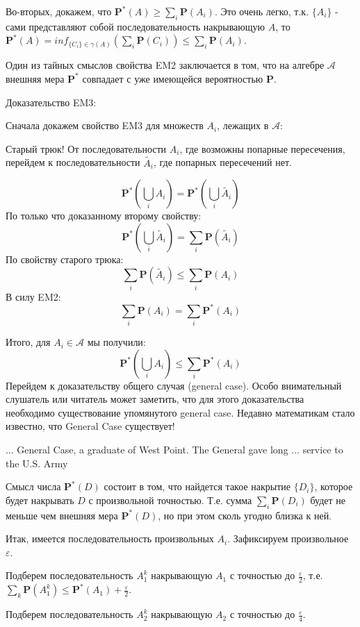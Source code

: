 {Во-вторых, докажем, что
$\mathbf{P^{*}}(A)\geq\sum_{i}\mathbf{P}(A_{i})$. Это очень легко,
т.к. $\{A_{i}\}$ - сами представляют собой последовательность
накрывающую $A$, то $\mathbf{P^{*}}(A)=inf_{\{C_{i}\}\in
\gamma(A)}(\sum_{i}\mathbf{P}(C_{i}))\leq
\sum_{i}\mathbf{P}(A_{i})$.

Один из тайных смыслов свойства EM2 заключается в том, что на
алгебре $\mathcal{A}$ внешняя мера $\mathbf{P^{*}}$ совпадает с
уже имеющейся вероятностью $\mathbf{P}$.

Доказательство EM3:

Сначала докажем свойство EM3 для множеств $A_{i}$, лежащих в
$\mathcal{A}$:

Старый трюк! От последовательности $A_{i}$, где возможны попарные
пересечения, перейдем к последовательности $\widetilde{A_{i}}$,
где попарных пересечений нет.

$$
\mathbf{P^{*}}(\bigcup_{i} A_{i})=\mathbf{P^{*}}(\bigcup_{i}
\widetilde{A_{i}})
$$
По только что доказанному второму свойству:
$$
\mathbf{P^{*}}(\bigcup_{i} \widetilde{A_{i}})
=\sum_{i}\mathbf{P}(\widetilde{A_{i}})
$$
По свойству старого трюка:
$$
\sum_{i}\mathbf{P}(\widetilde{A_{i}})\leq
\sum_{i}\mathbf{P}(A_{i})
$$
В силу EM2:
$$
\sum_{i}\mathbf{P}(A_{i}) = \sum_{i}\mathbf{P^{*}}(A_{i})
$$

Итого, для $A_{i} \in \mathcal{A}$ мы получили:
$$
\mathbf{P^{*}}(\bigcup_{i} A_{i}) \leq
\sum_{i}\mathbf{P^{*}}(A_{i})
$$
Перейдем к доказательству общего случая (general case). Особо
внимательный слушатель или читатель может заметить, что для этого
доказательства необходимо существование упомянутого general case.
Недавно математикам стало известно, что General Case существует!

... General Case, a graduate of West Point. The General gave long
... service to the U.S. Army


Смысл числа $\mathbf{P^{*}}(D)$ состоит в том, что найдется такое
накрытие $\{D_{i}\}$, которое будет накрывать $D$ с произвольной
точностью. Т.е. сумма $\sum_{i} \mathbf{P}(D_{i})$ будет не меньше
чем внешняя мера $\mathbf{P^{*}}(D)$, но при этом сколь угодно
близка к ней.

Итак, имеется последовательность произвольных $A_{i}$. Зафиксируем
произвольное $\varepsilon$.

Подберем последовательность $A_{1}^{k}$ накрывающую $A_{1}$ с
точностью до $\frac{\varepsilon}{2}$, т.е. $\sum_{k}
\mathbf{P}(A_{1}^{k})\leq
\mathbf{P^{*}}(A_{1})+\frac{\varepsilon}{2}$.

Подберем последовательность $A_{2}^{k}$ накрывающую $A_{2}$ с
точностью до $\frac{\varepsilon}{4}$.

}
